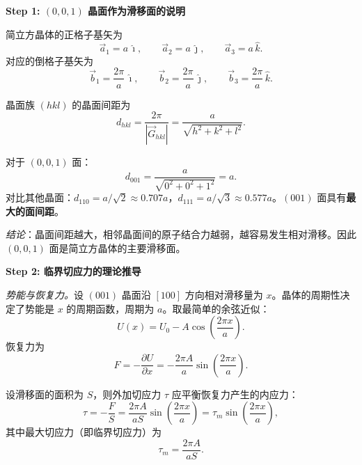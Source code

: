 \begin{derivationbox}[标准解题过程]
\textbf{Step 1: $(0,0,1)$ 晶面作为滑移面的说明}

简立方晶体的正格子基矢为
\begin{equation}
\vec a_1 = a\,\hat{\imath},\qquad
\vec a_2 = a\,\hat{\jmath},\qquad
\vec a_3 = a\,\hat{k}.
\end{equation}
对应的倒格子基矢为
\begin{equation}
\vec b_1 = \frac{2\pi}{a}\,\hat{\imath},\qquad
\vec b_2 = \frac{2\pi}{a}\,\hat{\jmath},\qquad
\vec b_3 = \frac{2\pi}{a}\,\hat{k}.
\end{equation}

晶面族 $(hkl)$ 的晶面间距为
\begin{equation}
d_{hkl} = \frac{2\pi}{|\vec G_{hkl}|} = \frac{a}{\sqrt{h^2+k^2+l^2}}.
\end{equation}

对于 $(0,0,1)$ 面：
\begin{equation}
d_{001} = \frac{a}{\sqrt{0^2+0^2+1^2}} = a.
\end{equation}
对比其他晶面：$d_{110}=a/\sqrt{2}\approx 0.707a$，$d_{111}=a/\sqrt{3}\approx 0.577a$。$(001)$ 面具有\textbf{最大的面间距}。

\textit{结论}：晶面间距越大，相邻晶面间的原子结合力越弱，越容易发生相对滑移。因此 $(0,0,1)$ 面是简立方晶体的主要滑移面。

\textbf{Step 2: 临界切应力的理论推导}

\textit{势能与恢复力。}设 $(001)$ 晶面沿 $[100]$ 方向相对滑移量为 $x$。晶体的周期性决定了势能是 $x$ 的周期函数，周期为 $a$。取最简单的余弦近似：
\begin{equation}
U(x) = U_0 - A\cos\!\left(\frac{2\pi x}{a}\right).
\end{equation}
恢复力为
\begin{equation}
F = -\frac{\partial U}{\partial x} = -\frac{2\pi A}{a}\sin\!\left(\frac{2\pi x}{a}\right).
\end{equation}

设滑移面的面积为 $S$，则外加切应力 $\tau$ 应平衡恢复力产生的内应力：
\begin{equation}
\tau = -\frac{F}{S} = \frac{2\pi A}{aS}\sin\!\left(\frac{2\pi x}{a}\right)
= \tau_m\sin\!\left(\frac{2\pi x}{a}\right),
\end{equation}
其中最大切应力（即临界切应力）为
\begin{equation}
\tau_m = \frac{2\pi A}{aS}.
\label{eq:tau-m-A}
\end{equation}


\end{derivationbox}
